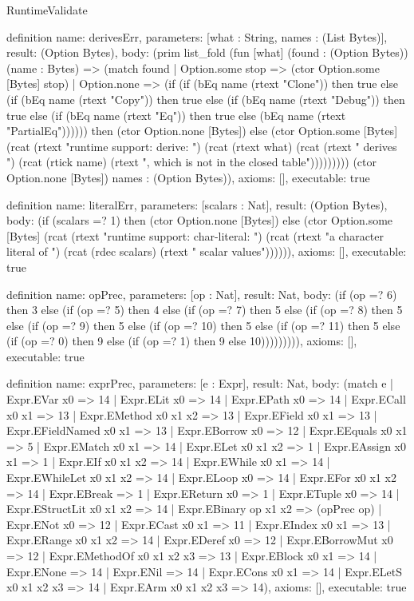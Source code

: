 \begin{lexlean}{RuntimeValidate}
\begin{semanticmodule}
definition{
  name: derivesErr,
  parameters: [what : String, names : (List Bytes)],
  result: (Option Bytes),
  body: (prim list_fold (fun [what] (found : (Option Bytes)) (name : Bytes) => (match found
    | Option.some stop => (ctor Option.some [Bytes] stop)
    | Option.none => (if (if (bEq name (rtext "Clone")) then true else (if (bEq name (rtext "Copy")) then true else (if (bEq name (rtext "Debug")) then true else (if (bEq name (rtext "Eq")) then true else (bEq name (rtext "PartialEq")))))) then (ctor Option.none [Bytes]) else (ctor Option.some [Bytes] (rcat (rtext "runtime support: derive: ") (rcat (rtext what) (rcat (rtext " derives ") (rcat (rtick name) (rtext ", which is not in the closed table"))))))))) (ctor Option.none [Bytes]) names : (Option Bytes)),
  axioms: [],
  executable: true
}

definition{
  name: literalErr,
  parameters: [scalars : Nat],
  result: (Option Bytes),
  body: (if (scalars =? 1) then (ctor Option.none [Bytes]) else (ctor Option.some [Bytes] (rcat (rtext "runtime support: char-literal: ") (rcat (rtext "a character literal of ") (rcat (rdec scalars) (rtext " scalar values")))))),
  axioms: [],
  executable: true
}

definition{
  name: opPrec,
  parameters: [op : Nat],
  result: Nat,
  body: (if (op =? 6) then 3 else (if (op =? 5) then 4 else (if (op =? 7) then 5 else (if (op =? 8) then 5 else (if (op =? 9) then 5 else (if (op =? 10) then 5 else (if (op =? 11) then 5 else (if (op =? 0) then 9 else (if (op =? 1) then 9 else 10))))))))),
  axioms: [],
  executable: true
}

definition{
  name: exprPrec,
  parameters: [e : Expr],
  result: Nat,
  body: (match e
    | Expr.EVar x0 => 14
    | Expr.ELit x0 => 14
    | Expr.EPath x0 => 14
    | Expr.ECall x0 x1 => 13
    | Expr.EMethod x0 x1 x2 => 13
    | Expr.EField x0 x1 => 13
    | Expr.EFieldNamed x0 x1 => 13
    | Expr.EBorrow x0 => 12
    | Expr.EEquals x0 x1 => 5
    | Expr.EMatch x0 x1 => 14
    | Expr.ELet x0 x1 x2 => 1
    | Expr.EAssign x0 x1 => 1
    | Expr.EIf x0 x1 x2 => 14
    | Expr.EWhile x0 x1 => 14
    | Expr.EWhileLet x0 x1 x2 => 14
    | Expr.ELoop x0 => 14
    | Expr.EFor x0 x1 x2 => 14
    | Expr.EBreak => 1
    | Expr.EReturn x0 => 1
    | Expr.ETuple x0 => 14
    | Expr.EStructLit x0 x1 x2 => 14
    | Expr.EBinary op x1 x2 => (opPrec op)
    | Expr.ENot x0 => 12
    | Expr.ECast x0 x1 => 11
    | Expr.EIndex x0 x1 => 13
    | Expr.ERange x0 x1 x2 => 14
    | Expr.EDeref x0 => 12
    | Expr.EBorrowMut x0 => 12
    | Expr.EMethodOf x0 x1 x2 x3 => 13
    | Expr.EBlock x0 x1 => 14
    | Expr.ENone => 14
    | Expr.ENil => 14
    | Expr.ECons x0 x1 => 14
    | Expr.ELetS x0 x1 x2 x3 => 14
    | Expr.EArm x0 x1 x2 x3 => 14),
  axioms: [],
  executable: true
}


\end{semanticmodule}
\end{lexlean}
